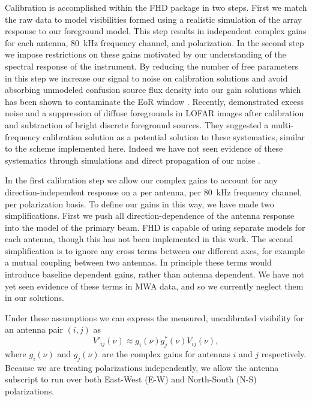 \documentclass[iop]{emulateapj}
\begin{document}
Calibration is accomplished within the FHD package in two steps. First we match the raw 
data to model visibilities formed using a realistic simulation of the array response to our 
foreground model. This step results in independent complex gains for each antenna, 
80~kHz frequency channel, and polarization. In the second step we impose restrictions on these 
gains motivated by our understanding of the spectral response of the instrument. By 
reducing the number of free parameters in this step we increase our signal to noise on 
calibration solutions and avoid absorbing unmodeled confusion source flux density into our gain 
solutions which has been shown to contaminate the EoR window \citep{Barry:2016}. 
Recently, \citealt{Patil:2016} demonstrated excess noise and a suppression of diffuse
foregrounds in LOFAR images after calibration and subtraction of bright discrete
foreground sources. They suggested a multi-frequency calibration solution as a potential
solution to these systematics, similar to the scheme implemented here. Indeed we have
not seen evidence of these systematics through simulations and direct propagation of
our noise \citep[Hazelton et al. 2016, in prep.]{Barry:2016}.

In the first calibration step we allow our complex gains to account for any direction-independent 
response on a per antenna, per 80~kHz frequency channel, per polarization basis. To 
define our gains in this way, we have made two simplifications. First we push all 
direction-dependence of the antenna response into the model of the primary beam. FHD is capable 
of using separate models for each antenna, though this has not been implemented in this 
work. The second simplification is to ignore any cross 
terms between our different axes, for example a mutual coupling between two antennas. In 
principle these terms would introduce baseline dependent gains, rather than antenna 
dependent. We have not yet seen evidence of these terms in MWA data, and so we currently 
neglect them in our solutions.

Under these assumptions we can express the measured, uncalibrated visibility for an 
antenna pair $(i,j)$ as
\begin{equation}
V'_{ij}(\nu) \approx g_i(\nu)g^*_j(\nu)V_{ij}(\nu),
\end{equation}
where $g_i(\nu)$ and $g_j(\nu)$ are the complex gains for antennas $i$ and $j$ 
respectively. Because we are treating polarizations independently, we allow the antenna 
subscript to run over both East-West (E-W) and North-South (N-S) polarizations.
\end{document}
